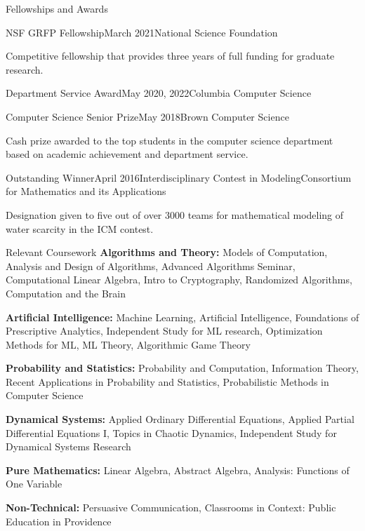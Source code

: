 \documentclass{resume} %
\begin{document}
\begin{rSection}{Fellowships and Awards} \itemsep -2pt

\begin{rSubsection}{NSF GRFP Fellowship}{March 2021}{National Science Foundation}{}
\item Competitive fellowship that provides three years of full funding for graduate research.
\end{rSubsection}


\begin{rSubsection}{Department Service Award}{May 2020, 2022}{Columbia Computer Science}{}
\end{rSubsection}


\begin{rSubsection}{Computer Science Senior Prize}{May 2018}{Brown Computer Science}{}
\item Cash prize awarded to the top students in the computer science department based on academic achievement and department service.
\end{rSubsection}

\begin{rSubsection}{Outstanding Winner}{April 2016}{Interdisciplinary Contest in Modeling}{Consortium for Mathematics and its Applications}
\item Designation given to five out of over 3000 teams for mathematical modeling of water scarcity in the ICM contest.
\end{rSubsection}

\end{rSection}



\begin{rSection}{Relevant Coursework}
\textbf{Algorithms and Theory:} Models of Computation, Analysis and Design of Algorithms, Advanced Algorithms Seminar, Computational Linear Algebra, Intro to Cryptography, Randomized Algorithms, Computation and the Brain

\textbf{Artificial Intelligence:} Machine Learning, Artificial Intelligence, Foundations of Prescriptive Analytics, Independent Study for ML research, Optimization Methods for ML, ML Theory, Algorithmic Game Theory

\textbf{Probability and Statistics:} Probability and Computation, Information Theory, Recent Applications in Probability and Statistics, Probabilistic Methods in Computer Science

\textbf{Dynamical Systems:} Applied Ordinary Differential Equations, Applied Partial Differential Equations I, Topics in Chaotic Dynamics, Independent Study for Dynamical Systems Research

\textbf{Pure Mathematics:} Linear Algebra, Abstract Algebra, Analysis: Functions of One Variable

\textbf{Non-Technical:} Persuasive Communication, Classrooms in Context: Public Education in Providence

\end{rSection}
\end{document}
